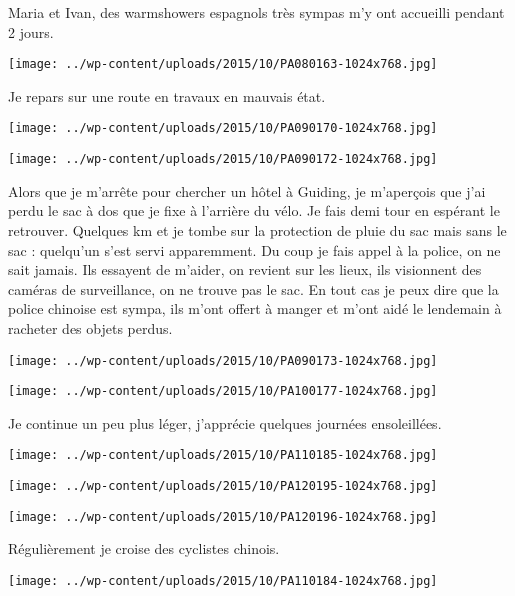 \pagebreak
 Maria et Ivan, des warmshowers espagnols très sympas m'y ont accueilli pendant 2 jours. 
\begin{center} \texttt{[image: ../wp-content/uploads/2015/10/PA080163-1024x768.jpg]} \end{center}

 Je repars sur une route en travaux en mauvais état. 
\begin{center} \texttt{[image: ../wp-content/uploads/2015/10/PA090170-1024x768.jpg]} \end{center}
\begin{center} \texttt{[image: ../wp-content/uploads/2015/10/PA090172-1024x768.jpg]} \end{center}

 Alors que je m'arrête pour chercher un hôtel à Guiding, je m'aperçois que j'ai perdu le sac à dos que je fixe à l'arrière du vélo. Je fais demi tour en espérant le retrouver. Quelques km et je tombe sur la protection de pluie du sac mais sans le sac : quelqu'un s'est servi apparemment. 
 Du coup je fais appel à la police, on ne sait jamais. Ils essayent de m'aider, on revient sur les lieux, ils visionnent des caméras de surveillance, on ne trouve pas le sac. En tout cas je peux dire que la police chinoise est sympa, ils m'ont offert à manger et m'ont aidé le lendemain à racheter des objets perdus. 
\begin{center} \texttt{[image: ../wp-content/uploads/2015/10/PA090173-1024x768.jpg]} \end{center}
\begin{center} \texttt{[image: ../wp-content/uploads/2015/10/PA100177-1024x768.jpg]} \end{center}

 Je continue un peu plus léger, j'apprécie quelques journées ensoleillées. 
\begin{center} \texttt{[image: ../wp-content/uploads/2015/10/PA110185-1024x768.jpg]} \end{center}
\begin{center} \texttt{[image: ../wp-content/uploads/2015/10/PA120195-1024x768.jpg]} \end{center}
\begin{center} \texttt{[image: ../wp-content/uploads/2015/10/PA120196-1024x768.jpg]} \end{center}

\pagebreak
 Régulièrement je croise des cyclistes chinois. 
\begin{center} \texttt{[image: ../wp-content/uploads/2015/10/PA110184-1024x768.jpg]} \end{center}

